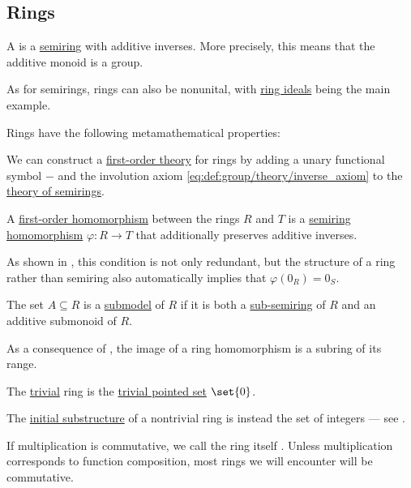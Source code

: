 \subsection{Rings}\label{subsec:rings}

\begin{definition}\label{def:ring}
  A  is a \hyperref[def:semiring]{semiring} with additive inverses. More precisely, this means that the additive monoid is a group.

  As for semirings, rings can also be nonunital, with \hyperref[def:semiring_ideal]{ring ideals} being the main example.

  Rings have the following metamathematical properties:
  \begin{thmenum}
     We can construct a \hyperref[def:first_order_theory]{first-order theory} for rings by adding a unary functional symbol \( - \) and the involution axiom \eqref{eq:def:group/theory/inverse_axiom} to the \hyperref[def:semiring/theory]{theory of semirings}.

     A \hyperref[def:first_order_homomorphism]{first-order homomorphism} between the rings \( R \) and \( T \) is a \hyperref[def:semiring/homomorphism]{semiring homomorphism} \( \varphi: R \to T \) that additionally preserves additive inverses.

    As shown in , this condition is not only redundant, but the structure of a ring rather than semiring also automatically implies that \( \varphi(0_R) = 0_S \).

     The set \( A \subseteq R \) is a \hyperref[thm:substructure_is_model]{submodel} of \( R \) if it is both a \hyperref[def:semiring]{sub-semiring} of \( R \) and an additive submonoid of \( R \).

    As a consequence of , the image of a ring homomorphism is a subring of its range.

     The \hyperref[def:trivial_structure]{trivial} ring is the \hyperref[rem:pointed_set/trivial]{trivial pointed set} \( \set{ 0 } \).

    The \hyperref[thm:substructures_form_complete_lattice/bottom]{initial substructure} of a nontrivial ring is instead the set of integers --- see .

     If multiplication is commutative, we call the ring itself . Unless multiplication corresponds to function composition, most rings we will encounter will be commutative.


\end{thmenum}
\end{definition}
